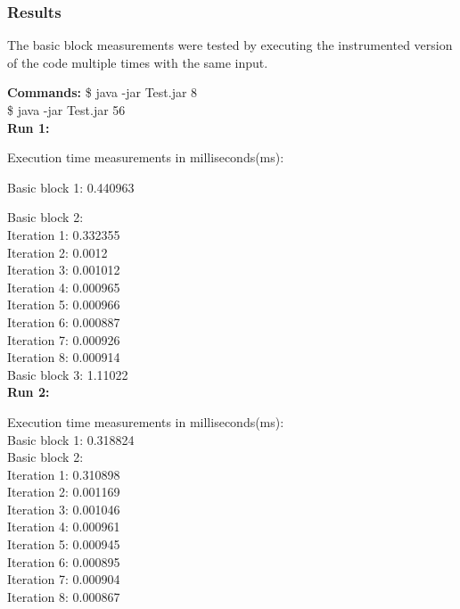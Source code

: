 \subsubsection{Results}
The basic block measurements were tested by executing the instrumented version of the code multiple times with the same input.\newline

\textbf{Commands:} \$ java -jar Test.jar 8\\
				   \$ java -jar Test.jar 56\\	  

\textbf{Run 1:}

Execution time measurements in milliseconds(ms):

Basic block 1: 0.440963 

Basic block 2:\\
\hspace{2em} Iteration 1: 0.332355\\
\hspace{2em} Iteration 2: 0.0012\\
\hspace{2em} Iteration 3: 0.001012\\
\hspace{2em} Iteration 4: 0.000965\\
\hspace{2em} Iteration 5: 0.000966\\
\hspace{2em} Iteration 6: 0.000887\\
\hspace{2em} Iteration 7: 0.000926\\
\hspace{2em} Iteration 8: 0.000914\\

Basic block 3: 1.11022\\

\textbf{Run 2:}

Execution time measurements in milliseconds(ms):\\

Basic block 1: 0.318824\\

Basic block 2:\\
\hspace{2em} Iteration 1: 0.310898\\
\hspace{2em} Iteration 2: 0.001169\\
\hspace{2em} Iteration 3: 0.001046\\
\hspace{2em} Iteration 4: 0.000961\\
\hspace{2em} Iteration 5: 0.000945\\
\hspace{2em} Iteration 6: 0.000895\\
\hspace{2em} Iteration 7: 0.000904\\
\hspace{2em} Iteration 8: 0.000867\\

